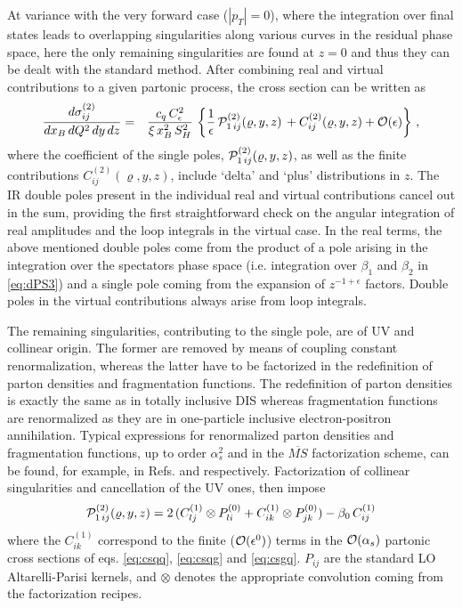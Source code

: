 \documentclass[superscriptaddress,showkeys,showpacs]{revtex4}
\begin{document}
At variance with the very forward case ($|p_T|=0$), where the integration 
over final states leads to overlapping singularities along various curves in 
the residual phase space, here the only remaining singularities are found at 
$z=0$ and thus they can be dealt with the standard method. 
After combining real and virtual contributions to a given partonic process, 
the cross section can be written as 
\begin{eqnarray}\label{eq:psigma2}
\frac{d\sigma^{(2)}_{ij}}{dx_B\,dQ^2\,dy\,dz}&=& \frac{c_q\,C_{\epsilon}^2}{\xi\,x_B^2\,S_H^2}\,
\left\{\frac{1}{\epsilon}\,{\cal{P}}^{(2)}_{1\, ij}(\varrho,y,z)\,
        +C^{(2)}_{ij}(\varrho,y,z)+{\cal O}(\epsilon)
        \right\}
\,, 
\end{eqnarray}
where the coefficient of the single poles, 
${\cal{P}}^{(2)}_{1\,ij}(\varrho,y,z)$, as well
as the finite contributions $C^{(2)}_{ij}(\varrho,y,z)$, include `delta' and `plus' 
distributions in $z$.
The IR double poles present in the individual real and virtual contributions cancel 
out 
in the sum, providing the first straightforward check on the angular integration 
of real amplitudes and
the loop integrals in the virtual case. In the real terms, the above 
mentioned double poles come from the product of a pole arising in the 
integration over the spectators phase space (i.e. integration
over $\beta_1$ and $\beta_2$ in \eqref{eq:dPS3}) and a single pole coming from the 
expansion of
$z^{-1+\epsilon}$ factors. Double poles in the virtual contributions always arise 
from loop 
integrals.

The remaining singularities, contributing to the single pole, are of UV and 
collinear origin. The 
former are removed by means of coupling constant renormalization, whereas the latter 
have to be factorized in the redefinition of 
parton densities and fragmentation functions. The redefinition
of parton densities is exactly the same as in totally inclusive DIS whereas
fragmentation functions are renormalized as they are in one-particle inclusive
electron-positron annihilation. Typical expressions for renormalized parton 
densities and fragmentation functions, up to order $\alpha_s^2$ and 
in the $\overline{MS}$ factorization scheme, can be found, for example, in
Refs.\cite{zijli} and \cite{rijken} respectively. Factorization of 
collinear singularities and cancellation of the UV ones, then impose
\begin{equation}\label{eq:facto}
{\cal{P}}^{(2)}_{1\,ij}(\varrho,y,z)=2\,(C_{lj}^{(1)}\otimes P^{(0)}_{li} 
+C_{ik}^{(1)}\otimes P^{(0)}_{jk})-\beta_0\,C_{ij}^{(1)}
\end{equation}
where the $C_{ik}^{(1)}$ correspond to the finite (${\cal O}(\epsilon^0)$) terms 
in the ${\cal{O}}(\alpha_s)$ partonic cross sections of eqs. 
\eqref{eq:csqq}, \eqref{eq:csqg} and \eqref{eq:csgq}. 
$P_{ij}$ are the standard  LO Altarelli-Parisi kernels, and
$\otimes$ denotes the appropriate convolution coming from the factorization
recipes. 
\end{document}
